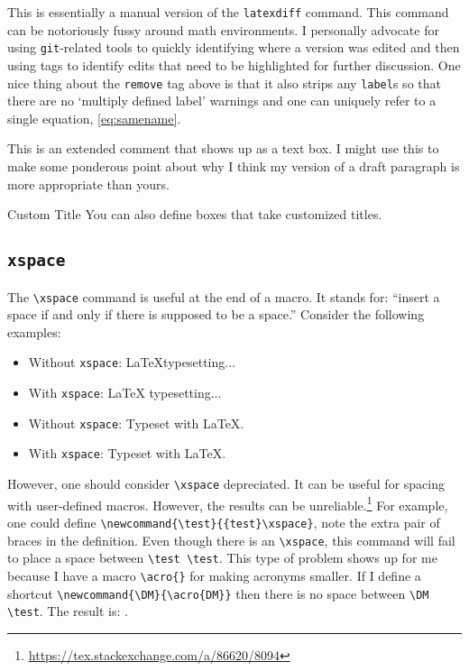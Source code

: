 
This is essentially a manual version of the \texttt{latexdiff} command. This command can be notoriously fussy around math environments. I personally advocate for using \texttt{git}-related tools to quickly identifying where a version was edited and then using tags to identify edits that need to be highlighted for further discussion. One nice thing about the \texttt{remove} tag above is that it also strips any \texttt{label}s so that there are no `multiply defined label' warnings and one can uniquely refer to a single equation, \eqref{eq:samename}.

\begin{flipcomment}
This is an extended comment that shows up as a text box. I might use this to make some ponderous point about why I think my version of a draft paragraph is more appropriate than yours.
\end{flipcomment}

\begin{boxedcomment}{Custom Title}
You can also define boxes that take customized titles. 
\end{boxedcomment}


\subsection{\texorpdfstring{\texttt{xspace}}{xspace}}

The \verb!\xspace! command is useful at the end of a macro. It stands for: ``insert a space if and only if there is supposed to be a space.'' Consider the following examples:
\begin{itemize}
	\item Without \texttt{xspace}: \LaTeX typesetting...
	\item With \texttt{xspace}: \LaTeX\xspace typesetting...
	\item Without \texttt{xspace}: Typeset with \LaTeX.
	\item With \texttt{xspace}: Typeset with \LaTeX\xspace.
\end{itemize}
However, one should consider \verb!\xspace! depreciated. It can be useful for spacing with user-defined macros. However, the results can be unreliable.\footnote{\url{https://tex.stackexchange.com/a/86620/8094}}  For example, one could define \verb!\newcommand{\test}{{test}\xspace}!, note the extra pair of braces in the definition. Even though there is an \verb!\xspace!, this command will fail to place a space between \verb!\test \test!. This type of problem shows up for me because I have a macro \verb!\acro{}! for making acronyms smaller. If I define a shortcut \verb!\newcommand{\DM}{\acro{DM}}! then there is no space between \verb!\DM \test!. The result is: \acro{DM}\xspace {test}. 

